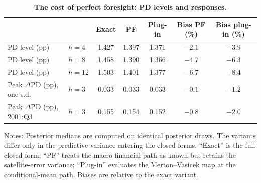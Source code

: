 \begin{table}[!htbp]
\centering
\scriptsize
\caption{\textbf{The cost of perfect foresight: PD levels and responses.}}
\label{tab:pf_bias}
\begin{tabular}{llccccc}
\toprule
 & & Exact & PF & Plug-in & Bias PF (\%) & Bias plug-in (\%) \\
\midrule
PD level (pp) & $h=4$ & 1.427 & 1.397 & 1.371 & $-2.1$ & $-3.9$ \\
PD level (pp) & $h=8$ & 1.458 & 1.390 & 1.366 & $-4.7$ & $-6.3$ \\
PD level (pp) & $h=12$ & 1.503 & 1.401 & 1.377 & $-6.7$ & $-8.4$ \\
\midrule
Peak $\Delta$PD (pp), one s.d. & $h=3$ & 0.033 & 0.033 & 0.033 & $-0.1$ & $-1.2$ \\
Peak $\Delta$PD (pp), 2001:Q3 & $h=3$ & 0.155 & 0.154 & 0.152 & $-0.8$ & $-2.0$ \\
\bottomrule
\end{tabular}
\begin{tablenotes}
\footnotesize
\item Notes: Posterior medians are computed on identical posterior draws. The variants differ only in the predictive variance entering the closed forms. ``Exact'' is the full closed form; ``PF'' treats the macro-financial path as known but retains the satellite-error variance; ``Plug-in'' evaluates the Merton--Vasicek map at the conditional-mean path. Biases are relative to the exact variant.
\end{tablenotes}
\end{table}
